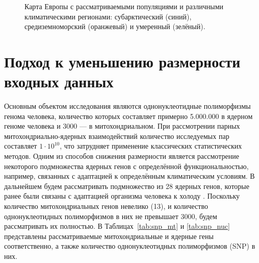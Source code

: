 \begin{figure}[ht]
	\caption[Карта Европы с рассматриваемыми популяциями и различными климатическими регионами.]{Карта Европы с рассматриваемыми популяциями и различными климатическими регионами: субарктический (синий), средиземноморский (оранжевый) и умеренный (зелёный).}\label{fig:europe_map}
\end{figure}

\section{Подход к уменьшению размерности входных данных}\label{sec:ch3/sec2}

Основным объектом исследования являются однонуклеотидные полиморфизмы генома человека, количество которых составляет примерно 5.000.000 в ядерном геноме человека и 3000 --- в митохондриальном. При рассмотрении парных митохондриально-ядерных взаимодействий количество исследуемых пар составляет $1 \cdot 10^{10}$, что затрудняет применение классических статистических методов. Одним из способов снижения размерности является рассмотрение некоторого подмножества ядерных генов с определённой функциональностью, например, связанных с адаптацией к определённым климатическим условиям. В дальнейшем будем рассматривать подмножество из 28 ядерных генов, которые ранее были связаны с адаптацией организма человека к холоду \autocite{Sazzini2014}. Поскольку количество митохондриальных генов невелико (13), и количество однонуклеотидных полиморфизмов в них не превышает 3000, будем рассматривать их полностью. В Таблицах~\ref{tab:snp_mt} и \ref{tab:snp_nuc} представлены рассматриваемые митохондриальные и ядерные гены соответственно, а также количество однонуклеотидных полиморфизмов (SNP) в них.

